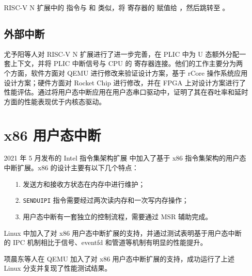 RISC-V N 扩展中的 \Iuret 指令与 \Imret 和 \Isret 类似，将 \Rustatus 寄存器的 \FcsrUstatusUpie 赋值给 \FcsrUstatusUie ，然后跳转至 \Ruepc。

\subsection{外部中断}

尤予阳等人对 RISC-V N 扩展进行了进一步完善，在 PLIC 中为 U 态额外分配一套上下文，并将 PLIC 中断信号与 CPU 的 \FcsrUipUsip 寄存器连接。他们的工作主要分为两个方面，软件方面对 QEMU 进行修改来验证设计方案，基于 rCore 操作系统应用设计方案；硬件方面对 Rocket Chip 进行修改，并在 FPGA 上对设计方案进行了性能评估。通过将用户态中断应用在用户态串口驱动中，证明了其在吞吐率和延时方面的性能表现优于内核态驱动。

\section{x86 用户态中断}

2021 年 5 月发布的 Intel 指令集架构扩展 \cite{inteluintr} 中加入了基于 x86 指令集架构的用户态中断扩展。x86 的设计主要有以下几个特点：

\begin{itemize}
    \item[1.] 发送方和接收方状态在内存中进行维护；
    \item[2.] {\tt SENDUIPI} 指令需要经过两次读内存和一次写内存操作；
    \item[3.] 用户态中断有一套独立的控制流程，需要通过 MSR 辅助完成。
\end{itemize}

Linux 中加入了对 x86 用户态中断扩展的支持，并通过测试表明基于用户态中断的 IPC 机制相比于信号、eventfd 和管道等机制有明显的性能提升\cite{x86uintr}。

项晨东等人在 QEMU 加入了对 x86 用户态中断扩展的支持，成功运行了上述 Linux 分支并复现了性能测试结果。